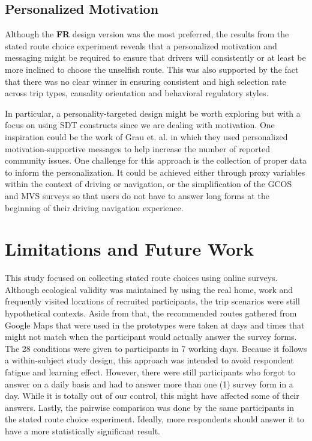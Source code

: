 \subsection{Personalized Motivation}
Although the \textbf{FR} design version was the most preferred, the results from the stated route choice experiment reveals that a personalized motivation and messaging might be required to ensure that drivers will consistently or at least be more inclined to choose the unselfish route. This was also supported by the fact that there was no clear winner in ensuring consistent and high selection rate across trip types, causality orientation and behavioral regulatory styles. 

In particular, a personality-targeted design\cite{nov2013personality,moon2002personalization} might be worth exploring but with a focus on using SDT constructs since we are dealing with motivation. One inspiration could be the work of Grau et. al.\cite{grau2018personalized} in which they used personalized motivation-supportive messages to help increase the number of reported community issues. One challenge for this approach is the collection of proper data to inform the personalization. It could be achieved either through proxy variables within the context of driving or navigation, or the simplification of the GCOS and MVS surveys so that users do not have to answer long forms at the beginning of their driving navigation experience. 

\section{Limitations and Future Work}
This study focused on collecting stated route choices using online surveys. Although ecological validity was maintained by using the real home, work and frequently visited locations of recruited participants, the trip scenarios were still hypothetical contexts. Aside from that, the recommended routes gathered from Google Maps that were used in the prototypes were taken at days and times that might not match when the participant would actually answer the survey forms. The 28 conditions were given to participants in 7 working days. Because it follows a within-subject study design, this approach was intended to avoid respondent fatigue and learning effect. However, there were still participants who forgot to answer on a daily basis and had to answer more than one (1) survey form in a day. While it is totally out of our control, this might have affected some of their answers. Lastly, the pairwise comparison was done by the same participants in the stated route choice experiment. Ideally, more respondents should answer it to have a more statistically significant result.


